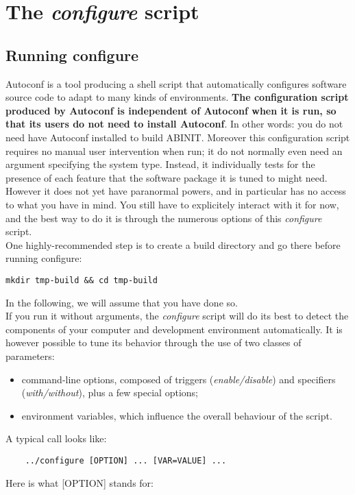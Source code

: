 \chapter{The \textit{configure} script}

\section{Running configure}

Autoconf is a tool producing a shell script that automatically configures
software source code to adapt to many kinds of environments. \textbf{The
configuration script produced by Autoconf is independent of Autoconf
when it is run, so that its users do not need to install Autoconf}.
In other words: you do not need have Autoconf installed to build ABINIT.
Moreover this configuration script requires no manual user intervention
when run; it do not normally even need an argument specifying the
system type. Instead, it individually tests for the presence of each
feature that the software package it is tuned to might need. However
it does not yet have paranormal powers, and in particular has no access
to what you have in mind. You still have to explicitely interact with
it for now, and the best way to do it is through the numerous options
of this \textit{configure} script. \\


One highly-recommended step is to create a build directory and go
there before running configure:

\begin{verbatim}
mkdir tmp-build && cd tmp-build
\end{verbatim}

In the following, we will assume that you have done so.\\


If you run it without arguments, the \textit{configure} script will
do its best to detect the components of your computer and development
environment automatically. It is however possible to tune its behavior
through the use of two classes of parameters:
\begin{itemize}
\item command-line options, composed of triggers (\textit{enable/disable})
and specifiers (\textit{with/without}), plus a few special options; 
\item environment variables, which influence the overall behaviour of the
script. 
\end{itemize}
A typical call looks like:\begin{verbatim}
    ../configure [OPTION] ... [VAR=VALUE] ...
\end{verbatim}Here is what {[}OPTION{]} stands for:


